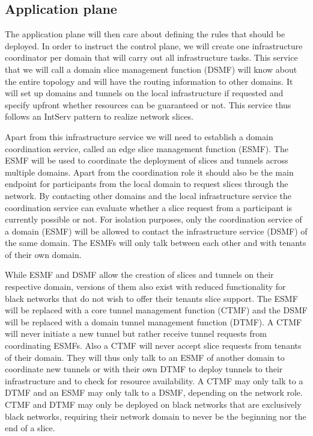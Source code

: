 
\subsection{Application plane}
The application plane will then care about defining the rules that should be deployed. In order to instruct the control plane, we will create one infrastructure coordinator per domain that will carry out all infrastructure tasks. This service that we will call a domain slice management function (DSMF) will know about the entire topology and will have the routing information to other domains. It will set up domains and tunnels on the local infrastructure if requested and specify upfront whether resources can be guaranteed or not. This service thus follows an IntServ pattern to realize network slices.

Apart from this infrastructure service we will need to establish a domain coordination service, called an edge slice management function (ESMF). The ESMF will be used to coordinate the deployment of slices and tunnels across multiple domains. Apart from the coordination role it should also be the main endpoint for participants from the local domain to request slices through the network. By contacting other domains and the local infrastructure service the coordination service can evaluate whether a slice request from a participant is currently possible or not. For isolation purposes, only the coordination service of a domain (ESMF) will be allowed to contact the infrastructure service (DSMF) of the same domain. The ESMFs will only talk between each other and with tenants of their own domain.

While ESMF and DSMF allow the creation of slices and tunnels on their respective domain, versions of them also exist with reduced functionality for black networks that do not wish to offer their tenants slice support. The ESMF will be replaced with a core tunnel management function (CTMF) and the DSMF will be replaced with a domain tunnel management function (DTMF). A CTMF will never initiate a new tunnel but rather receive tunnel requests from coordinating ESMFs. Also a CTMF will never accept slice requests from tenants of their domain. They will thus only talk to an ESMF of another domain to coordinate new tunnels or with their own DTMF to deploy tunnels to their infrastructure and to check for resource availability. A CTMF may only talk to a DTMF and an ESMF may only talk to a DSMF, depending on the network role. CTMF and DTMF may only be deployed on black networks that are exclusively black networks, requiring their network domain to never be the beginning nor the end of a slice.

